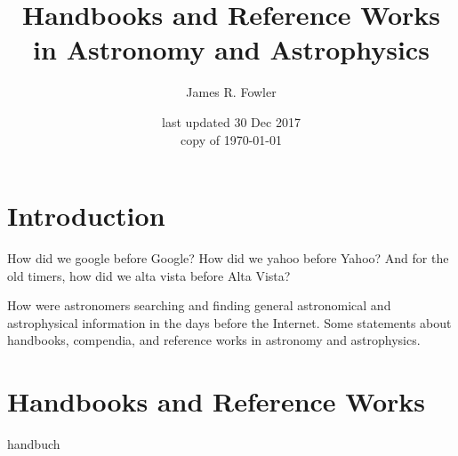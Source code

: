 \documentclass{article}
\begin{document}
\title{Handbooks and Reference Works in Astronomy and Astrophysics}
\author{James R. Fowler}
\date{last updated 30 Dec 2017\\ copy of \today}

\maketitle

\tableofcontents
\listoftables


\section{Introduction}

How did we google before Google\texttrademark? How did we yahoo before
Yahoo\texttrademark? And for the old timers, how did we alta vista
before Alta Vista\texttrademark?

How were astronomers searching and finding general astronomical and
astrophysical information in the days before the Internet. Some
statements about handbooks, compendia, and reference works in 
astronomy and astrophysics.

\section{Handbooks and Reference Works}
{handbuch}
\end{document}
